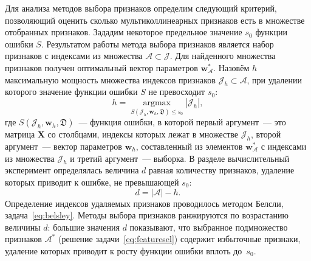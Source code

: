 \documentclass[a4paper,12pt]{article}
\newcommand{\bw}{\mathbf{w}}
\newcommand{\bX}{\mathbf{X}}
\newcommand{\calJ}{\mathcal{J}}
\newcommand{\calA}{\mathcal{A}}
\newcommand{\frakD}{\mathfrak{D}}
\theoremstyle{plain}
\begin{document}
Для анализа методов выбора признаков определим следующий критерий, позволяющий оценить сколько мультиколлинеарных признаков есть в множестве отобранных признаков. Зададим некоторое предельное значение $s_0$ функции ошибки $S$. Результатом работы метода выбора признаков является набор признаков с индексами из множества $\calA \subset \calJ$. Для найденного множества признаков получен оптимальный вектор параметров $\bw^*_{\calA}$. Назовём $ h $ максимальную мощность множества индексов признаков $\calJ_h \subset \calA $, при удалении которого значение функции ошибки $S$ не превосходит $s_0$:
\begin{equation}
h = \mathop{\arg\max}\limits_{S(\calJ_h, \bw_h, \frakD) \leq s_0} |\calJ_h|,
\label{eq:crit}
\end{equation}
где $S(\calJ_h, \bw_h, \frakD)$~--- функция ошибки, в которой первый аргумент~--- это матрица $\bX$ со столбцами, индексы которых лежат в множестве $\calJ_h$, второй аргумент~--- вектор параметров $\bw_h$, составленный из элементов $\bw^*_{\calA}$ с индексами из множества $\calJ_h$ и третий аргумент~--- выборка. В разделе вычислительный эксперимент определялась величина $d$ равная количеству признаков, удаление которых приводит к ошибке, не превышающей $s_0$:
\[
d = |\calA| - h.
\] 
Определение индексов удаляемых признаков  проводилось методом Белсли, задача~\eqref{eq:belsley}. 
Методы выбора признаков ранжируются по возрастанию величины $d$: большие значения $d$ показывают, что выбранное подмножество признаков $\calA^*$ (решение задачи~\eqref{eq:featuresel}) содержит избыточные признаки, удаление которых приводит к росту функции ошибки вплоть до~$s_0$. 
\end{document}
